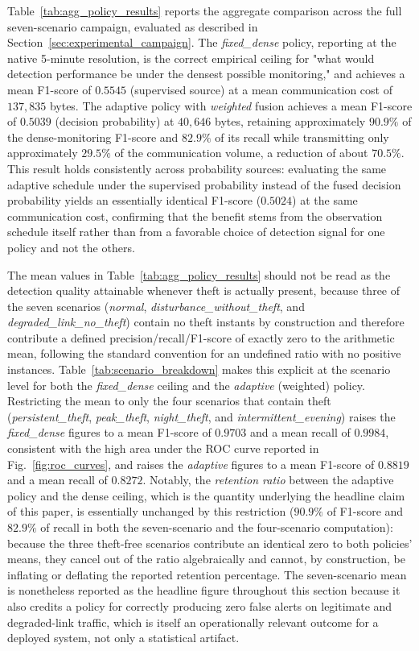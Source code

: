 \documentclass{ieeeaccess}
\begin{document}
Table~\ref{tab:agg_policy_results} reports the aggregate comparison across the full seven-scenario campaign, evaluated as described in Section~\ref{sec:experimental_campaign}. The \textit{fixed\_dense} policy, reporting at the native 5-minute resolution, is the correct empirical ceiling for "what would detection performance be under the densest possible monitoring," and achieves a mean F1-score of $0.5545$ (supervised source) at a mean communication cost of $137{,}835$ bytes. The adaptive policy with \textit{weighted} fusion achieves a mean F1-score of $0.5039$ (decision probability) at $40{,}646$ bytes, retaining approximately $90.9\%$ of the dense-monitoring F1-score and $82.9\%$ of its recall while transmitting only approximately $29.5\%$ of the communication volume, a reduction of about $70.5\%$. This result holds consistently across probability sources: evaluating the same adaptive schedule under the supervised probability instead of the fused decision probability yields an essentially identical F1-score ($0.5024$) at the same communication cost, confirming that the benefit stems from the observation schedule itself rather than from a favorable choice of detection signal for one policy and not the others.

The mean values in Table~\ref{tab:agg_policy_results} should not be read as the detection quality attainable whenever theft is actually present, because three of the seven scenarios (\textit{normal}, \textit{disturbance\_without\_theft}, and \textit{degraded\_link\_no\_theft}) contain no theft instants by construction and therefore contribute a defined precision/recall/F1-score of exactly zero to the arithmetic mean, following the standard convention for an undefined ratio with no positive instances. Table~\ref{tab:scenario_breakdown} makes this explicit at the scenario level for both the \textit{fixed\_dense} ceiling and the \textit{adaptive} (weighted) policy. Restricting the mean to only the four scenarios that contain theft (\textit{persistent\_theft}, \textit{peak\_theft}, \textit{night\_theft}, and \textit{intermittent\_evening}) raises the \textit{fixed\_dense} figures to a mean F1-score of $0.9703$ and a mean recall of $0.9984$, consistent with the high area under the ROC curve reported in Fig.~\ref{fig:roc_curves}, and raises the \textit{adaptive} figures to a mean F1-score of $0.8819$ and a mean recall of $0.8272$. Notably, the \emph{retention ratio} between the adaptive policy and the dense ceiling, which is the quantity underlying the headline claim of this paper, is essentially unchanged by this restriction ($90.9\%$ of F1-score and $82.9\%$ of recall in both the seven-scenario and the four-scenario computation): because the three theft-free scenarios contribute an identical zero to both policies' means, they cancel out of the ratio algebraically and cannot, by construction, be inflating or deflating the reported retention percentage. The seven-scenario mean is nonetheless reported as the headline figure throughout this section because it also credits a policy for correctly producing zero false alerts on legitimate and degraded-link traffic, which is itself an operationally relevant outcome for a deployed system, not only a statistical artifact.
\end{document}
